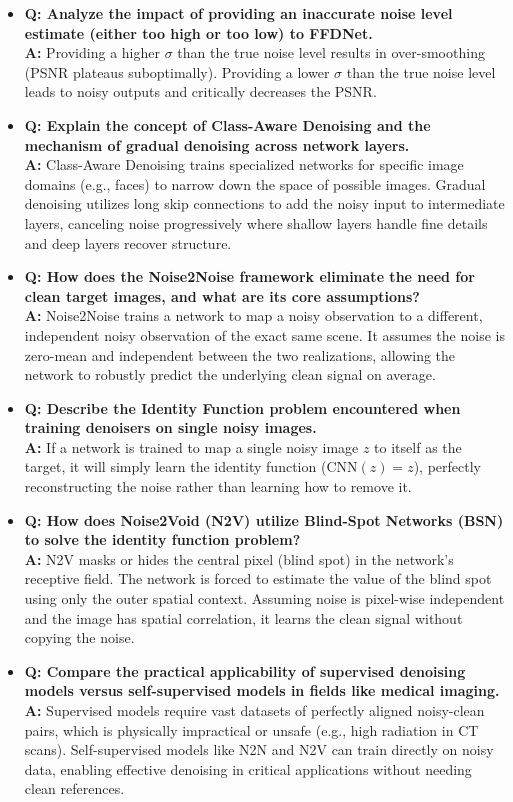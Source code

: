 \begin{itemize}
    \item \textbf{Q: Analyze the impact of providing an inaccurate noise level estimate (either too high or too low) to FFDNet.} \\
    \textbf{A:} Providing a higher $\sigma$ than the true noise level results in over-smoothing (PSNR plateaus suboptimally). Providing a lower $\sigma$ than the true noise level leads to noisy outputs and critically decreases the PSNR.
    
    \item \textbf{Q: Explain the concept of Class-Aware Denoising and the mechanism of gradual denoising across network layers.} \\
    \textbf{A:} Class-Aware Denoising trains specialized networks for specific image domains (e.g., faces) to narrow down the space of possible images. Gradual denoising utilizes long skip connections to add the noisy input to intermediate layers, canceling noise progressively where shallow layers handle fine details and deep layers recover structure.
    
    \item \textbf{Q: How does the Noise2Noise framework eliminate the need for clean target images, and what are its core assumptions?} \\
    \textbf{A:} Noise2Noise trains a network to map a noisy observation to a different, independent noisy observation of the exact same scene. It assumes the noise is zero-mean and independent between the two realizations, allowing the network to robustly predict the underlying clean signal on average.
    
    \item \textbf{Q: Describe the Identity Function problem encountered when training denoisers on single noisy images.} \\
    \textbf{A:} If a network is trained to map a single noisy image $z$ to itself as the target, it will simply learn the identity function ($\text{CNN}(z) = z$), perfectly reconstructing the noise rather than learning how to remove it.
    
    \item \textbf{Q: How does Noise2Void (N2V) utilize Blind-Spot Networks (BSN) to solve the identity function problem?} \\
    \textbf{A:} N2V masks or hides the central pixel (blind spot) in the network's receptive field. The network is forced to estimate the value of the blind spot using only the outer spatial context. Assuming noise is pixel-wise independent and the image has spatial correlation, it learns the clean signal without copying the noise.
    
    \item \textbf{Q: Compare the practical applicability of supervised denoising models versus self-supervised models in fields like medical imaging.} \\
    \textbf{A:} Supervised models require vast datasets of perfectly aligned noisy-clean pairs, which is physically impractical or unsafe (e.g., high radiation in CT scans). Self-supervised models like N2N and N2V can train directly on noisy data, enabling effective denoising in critical applications without needing clean references.
\end{itemize}
